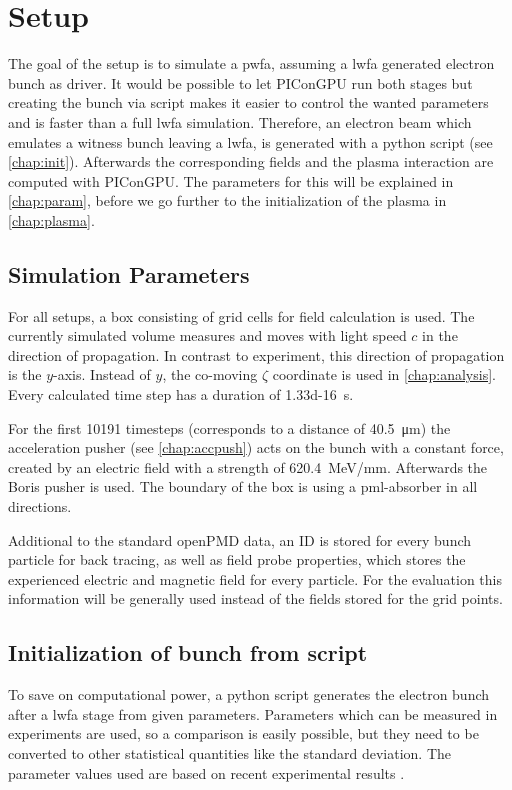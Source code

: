 \documentclass[bachelor_thesis]{subfiles}
\begin{document}
\chapter{Setup}\label{chap:setup}
The goal of the setup is to simulate a \gls{pwfa}, assuming a \gls{lwfa} generated electron bunch as driver. It would be possible to let PIConGPU run both stages but creating the bunch via script makes it easier to control the wanted parameters and is faster than a full \gls{lwfa} simulation.
Therefore, an electron beam which emulates a witness bunch leaving a \gls{lwfa}, is generated with a python script (see \autoref{chap:init}). Afterwards the corresponding fields and the plasma interaction are computed with PIConGPU. 
The parameters for this will  be explained in \autoref{chap:param}, before we go further to the initialization of the plasma in \autoref{chap:plasma}.


\section{Simulation Parameters}\label{chap:param}
For all setups, a box consisting of  grid cells for field calculation is used. The currently simulated volume measures  and moves with light speed $c$ in the direction of propagation.
In contrast to experiment, this direction of propagation is the $y$-axis. Instead of $y$, the co-moving $\zeta$ coordinate is used in \autoref{chap:analysis}.
Every calculated time step has a duration of \qty{1.33d-16}{\s}. 

For the first \num{10191} timesteps (corresponds to a distance of \qty{40.5}{\um}) the acceleration pusher (see \autoref{chap:accpush}) acts on the bunch with a constant force, 
created by an electric field with a strength of \qty{620.4}{\MeV/\mm}. Afterwards the Boris pusher is used. 
The boundary of the box is using a \gls{pml}-absorber in all directions. 

Additional to the standard openPMD data, an ID is stored for every bunch particle for back tracing, as well as field probe properties, which stores the experienced electric and magnetic field for every particle. 
For the evaluation this information will be generally used instead of the fields stored for the grid points.


\section{Initialization of bunch from script}\label{chap:init}
To save on computational power, a python script generates the electron bunch after a \gls{lwfa} stage from given parameters. Parameters which can be measured in experiments are used,
so a comparison is easily possible, but they need to be converted to other statistical quantities like the standard deviation. The parameter values used are based on recent experimental results \cite{Kurz2021, Schoebel2022, Cabadag2021}.
\end{document}

